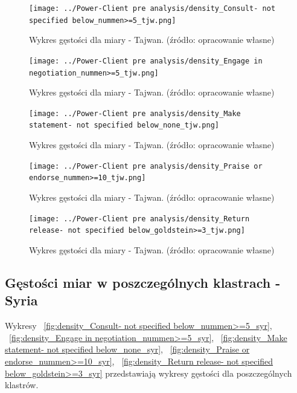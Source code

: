 \documentclass[11pt]{report}
\begin{document}
    \begin{figure}[!htp]
        \centering
        \texttt{[image: ../Power-Client pre analysis/density\_Consult- not specified below\_nummen>=5\_tjw.png]}
        \caption{Wykres gęstości dla miary - Tajwan. (źródło: opracowanie własne)}
        \label{fig:density_Consult- not specified below_nummen>=5_tjw}
    \end{figure}
    \begin{figure}[!htp]
        \centering
        \texttt{[image: ../Power-Client pre analysis/density\_Engage in negotiation\_nummen>=5\_tjw.png]}
        \caption{Wykres gęstości dla miary - Tajwan. (źródło: opracowanie własne)}
        \label{fig:density_Engage in negotiation_nummen>=5_tjw}
    \end{figure}
    \begin{figure}[!htp]
        \centering
        \texttt{[image: ../Power-Client pre analysis/density\_Make statement- not specified below\_none\_tjw.png]}
        \caption{Wykres gęstości dla miary - Tajwan. (źródło: opracowanie własne)}
        \label{fig:density_Make statement- not specified below_none_tjw}
    \end{figure}
    \begin{figure}[!htp]
        \centering
        \texttt{[image: ../Power-Client pre analysis/density\_Praise or endorse\_nummen>=10\_tjw.png]}
        \caption{Wykres gęstości dla miary - Tajwan. (źródło: opracowanie własne)}
        \label{fig:density_Praise or endorse_nummen>=10_tjw}
    \end{figure}
    \begin{figure}[!htp]
        \centering
        \texttt{[image: ../Power-Client pre analysis/density\_Return release- not specified below\_goldstein>=3\_tjw.png]}
        \caption{Wykres gęstości dla miary - Tajwan. (źródło: opracowanie własne)}
        \label{fig:density_Return release- not specified below_goldstein>=3_tjw}
    \end{figure}

    \subsection{Gęstości miar w poszczególnych klastrach - Syria}\label{subsec:gęstośc-miar-w-poszczególnych-klastrach---syria}

    Wykresy
    ~\ref{fig:density_Consult- not specified below_nummen>=5_syr},
    ~\ref{fig:density_Engage in negotiation_nummen>=5_syr},
    ~\ref{fig:density_Make statement- not specified below_none_syr},
    ~\ref{fig:density_Praise or endorse_nummen>=10_syr},
    ~\ref{fig:density_Return release- not specified below_goldstein>=3_syr}
    przedstawiają wykresy gęstości dla poszczególnych klastrów.
\end{document}

